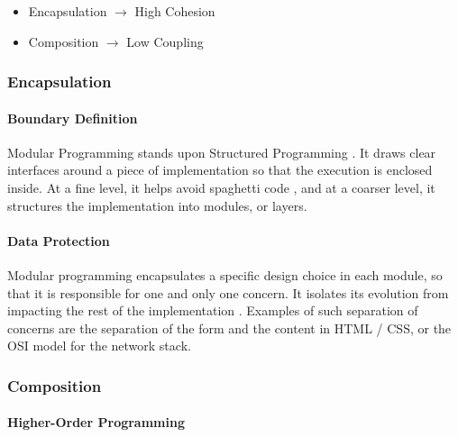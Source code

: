 \begin{itemize}
\item Encapsulation $\to$ High Cohesion
\item Composition $\to$ Low Coupling
\end{itemize}

\subsubsection{Encapsulation}

\paragraph{Boundary Definition}

Modular Programming stands upon Structured Programming \cite{Dijkstra1970}.
It draws clear interfaces around a piece of implementation so that the execution is enclosed inside.
At a fine level, it helps avoid spaghetti code \cite{Dijkstra1968a}, and at a coarser level, it structures the implementation \cite{Dijkstra1968} into modules, or layers.

\paragraph{Data Protection}

Modular programming encapsulates a specific design choice in each module, so that it is responsible for one and only one concern.
It isolates its evolution from impacting the rest of the implementation \cite{Parnas1972, Tarr1999, Hursch1995}.
Examples of such separation of concerns are the separation of the form and the content in HTML / CSS, or the OSI model for the network stack.

\subsubsection{Composition} \label{chapter3:software-maintainability:modularity:features}

\paragraph{Higher-Order Programming}


